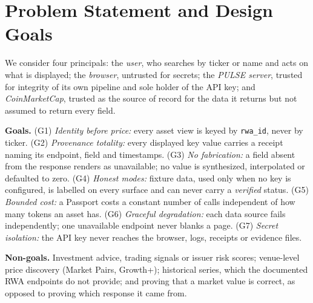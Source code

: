 \documentclass[11pt]{article}
\newcommand{\code}[1]{\texttt{\small #1}}
\begin{document}
\section{Problem Statement and Design Goals}

We consider four principals: the \emph{user}, who searches by ticker or name and acts on what is displayed; the \emph{browser}, untrusted for secrets; the \emph{PULSE server}, trusted for integrity of its own pipeline and sole holder of the API key; and \emph{CoinMarketCap}, trusted as the source of record for the data it returns but not assumed to return every field.

\textbf{Goals.} (G1) \emph{Identity before price:} every asset view is keyed by \code{rwa\_id}, never by ticker. (G2) \emph{Provenance totality:} every displayed key value carries a receipt naming its endpoint, field and timestamps. (G3) \emph{No fabrication:} a field absent from the response renders as unavailable; no value is synthesized, interpolated or defaulted to zero. (G4) \emph{Honest modes:} fixture data, used only when no key is configured, is labelled on every surface and can never carry a \emph{verified} status. (G5) \emph{Bounded cost:} a Passport costs a constant number of calls independent of how many tokens an asset has. (G6) \emph{Graceful degradation:} each data source fails independently; one unavailable endpoint never blanks a page. (G7) \emph{Secret isolation:} the API key never reaches the browser, logs, receipts or evidence files.

\textbf{Non-goals.} Investment advice, trading signals or issuer risk scores; venue-level price discovery (Market Pairs, Growth+); historical series, which the documented RWA endpoints do not provide; and proving that a market value is correct, as opposed to proving which response it came from.
\end{document}
